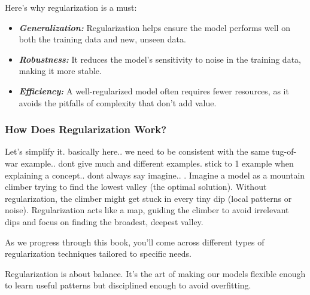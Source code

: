 Here’s why regularization is a must:

\begin{itemize}
    \item \textbf{\textit{Generalization: }}Regularization helps ensure the model performs well on both the training data and new, unseen data.
    \item \textbf{\textit{Robustness:}} It reduces the model's sensitivity to noise in the training data, making it more stable.
    \item \textbf{\textit{Efficiency:}} A well-regularized model often requires fewer resources, as it avoids the pitfalls of complexity that don’t add value.
\end{itemize}

\subsubsection{How Does Regularization Work?}
Let’s simplify it. basically here.. we need to be consistent with the same tug-of-war example.. dont give much and different examples. stick to 1 example when explaining a concept.. dont always say imagine.. . Imagine a model as a mountain climber trying to find the lowest valley (the optimal solution). Without regularization, the climber might get stuck in every tiny dip (local patterns or noise). Regularization acts like a map, guiding the climber to avoid irrelevant dips and focus on finding the broadest, deepest valley.



As we progress through this book, you’ll come across different types of regularization techniques tailored to specific needs. 
\begin{tcolorbox}[enhanced,
  watermark opacity=0.3,watermark zoom=0.9,
  colback=blue!5!white, colframe=blue!70!white,
  fonttitle=\bfseries, title=\textit{Remember}]
  Regularization is about balance. It’s the art of making our models flexible enough to learn useful patterns but disciplined enough to avoid overfitting.
\end{tcolorbox}